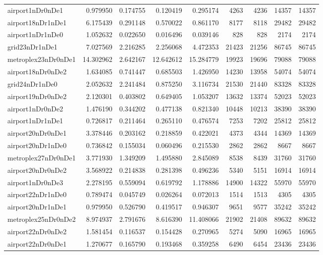 \begin{longtable}{|l|r|r|r|r|r|r|r|r|}
airport1nDr0nDe1 & 0.979950 & 0.174755 & 0.120419 & 0.295174 & 4263 & 4236 & 14357 & 14357 \\
airport18nDr1nDe1 & 6.175439 & 0.291148 & 0.570022 & 0.861170 & 8177 & 8118 & 29482 & 29482 \\
airport1nDr1nDe0 & 1.052632 & 0.022650 & 0.016496 & 0.039146 & 828 & 828 & 2174 & 2174 \\
grid23nDr1nDe1 & 7.027569 & 2.216285 & 2.256068 & 4.472353 & 21423 & 21256 & 86745 & 86745 \\
metroplex23nDr0nDe1 & 14.302962 & 2.642167 & 12.642612 & 15.284779 & 19923 & 19696 & 79088 & 79088 \\
airport18nDr0nDe2 & 1.634085 & 0.741447 & 0.685503 & 1.426950 & 14230 & 13958 & 54074 & 54074 \\
grid24nDr1nDe0 & 2.052632 & 2.241484 & 0.875250 & 3.116734 & 21530 & 21440 & 83328 & 83328 \\
airport19nDr0nDe2 & 2.120301 & 0.403802 & 0.649405 & 1.053207 & 13632 & 13374 & 52023 & 52023 \\
airport1nDr0nDe2 & 1.476190 & 0.344202 & 0.477138 & 0.821340 & 10448 & 10213 & 38390 & 38390 \\
airport1nDr1nDe1 & 0.726817 & 0.211464 & 0.265110 & 0.476574 & 7253 & 7202 & 25812 & 25812 \\
airport20nDr0nDe1 & 3.378446 & 0.203162 & 0.218859 & 0.422021 & 4373 & 4344 & 14369 & 14369 \\
airport20nDr1nDe0 & 0.736842 & 0.155034 & 0.060496 & 0.215530 & 2862 & 2862 & 8667 & 8667 \\
metroplex27nDr0nDe1 & 3.771930 & 1.349209 & 1.495880 & 2.845089 & 8538 & 8439 & 31760 & 31760 \\
airport20nDr0nDe2 & 3.568922 & 0.214838 & 0.281398 & 0.496236 & 5340 & 5151 & 16914 & 16914 \\
airport1nDr0nDe3 & 2.278195 & 0.559094 & 0.619792 & 1.178886 & 14900 & 14322 & 55970 & 55970 \\
airport22nDr1nDe0 & 0.789474 & 0.045749 & 0.026264 & 0.072013 & 1514 & 1513 & 4305 & 4305 \\
airport20nDr1nDe1 & 0.979950 & 0.526790 & 0.419517 & 0.946307 & 9651 & 9577 & 35242 & 35242 \\
metroplex25nDr0nDe2 & 8.974937 & 2.791676 & 8.616390 & 11.408066 & 21902 & 21408 & 89632 & 89632 \\
airport22nDr0nDe2 & 1.581454 & 0.116537 & 0.154428 & 0.270965 & 5274 & 5090 & 16965 & 16965 \\
airport22nDr0nDe1 & 1.270677 & 0.165790 & 0.193468 & 0.359258 & 6490 & 6454 & 23436 & 23436 \\

\end{longtable}
